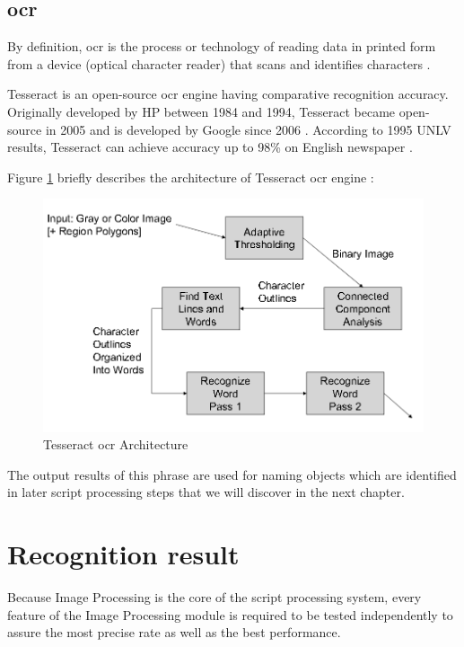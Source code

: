 \subsection{\acrlong{ocr}}
\label{sec:ocr}
By definition, \acrfull{ocr} is the process or technology of reading data in printed form from a device (optical character reader) that scans and identifies characters \cite{ocr_def}.

Tesseract is an open-source \acrshort{ocr} engine having comparative recognition accuracy. Originally developed by HP between 1984 and 1994, Tesseract became open-source in 2005 and is developed by Google since 2006 \cite{ocr_overview}. According to 1995 UNLV results, Tesseract can achieve accuracy up to 98\% on English newspaper \cite{Rice_thefourth}.

Figure \ref{fig:tesseract_arch} briefly describes the architecture of Tesseract \acrshort{ocr} engine \cite{tesseract_oscon}:

	\begin{figure}[H]
		\centering
		\includegraphics[scale=0.65]{Chapters/Fig/tesseract_arch.png}
		\caption{Tesseract \acrshort{ocr} Architecture}
		\label{fig:tesseract_arch}
	\end{figure}

The output results of this phrase are used for naming objects which are identified in later script processing steps that we will discover in the next chapter.

\section{Recognition result}
Because Image Processing is the core of the script processing system, every feature of the Image Processing module is required to be tested independently to assure the most precise rate as well as the best performance.


